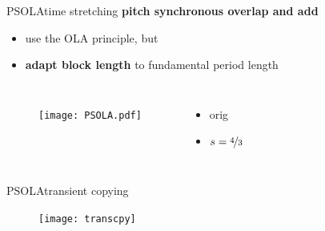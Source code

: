     \begin{frame}{PSOLA}{time stretching}
            \textbf{pitch synchronous overlap and add}
            \begin{itemize}
                \item   use the OLA principle, but
                \item	\textbf{adapt block length} to fundamental period length
            \end{itemize}
            \pause
            \begin{columns}
                    \begin{figure}
                        \centering
                        \texttt{[image: PSOLA.pdf]}
                    \end{figure}\vspace{-5mm}
                    \vspace{10mm}
                    \begin{itemize}
                        \item   {}\; orig
                        \item {}\; $s = \nicefrac{4}{3}$ 
                    \end{itemize}
            \end{columns}
            \vspace{50mm}
    \end{frame}
\begin{frame}{PSOLA}{transient copying}
				\begin{figure}
					\centerline{\texttt{[image: transcpy]}}
				\end{figure}
\end{frame}

